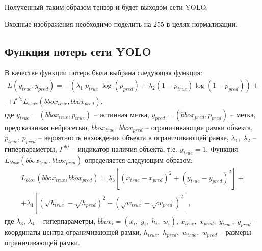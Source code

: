 \documentclass[14pt,a4paper]{extarticle}
\begin{document}
Полученный таким образом тензор и будет выходом сети YOLO.

Входные изображения необходимо поделить на 255 в целях нормализации.

\newpage
\subsection{Функция потерь сети YOLO}
В качестве функции потерь была выбрана следующая функция:
\begin{multline}
L \left(y_{true}, y_{pred}\right) = - \left(\lambda_1\; p_{true}\; \log \left(p_{pred}\right) +\lambda_2 \left(1 - p_{true}\right) \log \left(1 - p_{pred}\right)\right) + \\
+I^{obj} L_{bbox} \left(bbox_{true}, bbox_{pred}\right),
\end{multline}
где $y_{true} = (bbox_{true}, p_{true})$ -- истинная метка, $y_{pred} = (bbox_{pred}, p_{pred})$ -- метка, предсказанная нейросетью, $bbox_{true}$, $bbox_{pred}$ -- ограничивающие рамки объекта, $p_{true}$, $p_{pred}$ -- вероятность нахождения объекта в ограничивающей рамке, $\lambda_1,\; \lambda_2$ -- гиперпараметры, $I^{obj}$ -- индикатор наличия объекта, т.е. $y_{true} = 1$.
Функция $L_{bbox} \left(bbox_{true}, bbox_{pred}\right)$ определяется следующим образом:
\begin{multline}
L_{bbox} \left(bbox_{true}, bbox_{pred}\right) = \lambda_3 \left[\left(x_{true} -  x_{pred}\right)^2 + \left(y_{true} -  y_{pred}\right)^2\right] +
\\ + \lambda_4 \left[\left(\sqrt{h_{true}} -  \sqrt{h_{pred}}\right)^2 + \left(\sqrt{w_{true}} -  \sqrt{w_{pred}}\right)^2\right],
\end{multline}
где $\lambda_3$, $\lambda_4$ -- гиперпараметры, $bbox_i = \left(x_i,\;y_i,\;h_i,\;w_i\right)$, $x_{true},\; x_{pred},\;y_{true},\; y_{pred}$ -- координаты центра ограничивающей рамки, $h_{true},\; h_{pred},\;w_{true},\; w_{pred}$ -- размеры ограничивающей рамки.

\newpage
\end{document}
